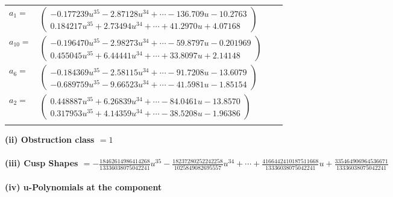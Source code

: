 \documentclass[1p]{elsarticle_modified}
\theoremstyle{definition}
\begin{document}
\begin{tabular}{m{7pt} m{180pt} m{7pt} m{180pt} }
\flushright $a_{1}=$&$\begin{pmatrix}-0.177239 u^{35}-2.87128 u^{34}+\cdots-136.709 u-10.2763\\0.184217 u^{35}+2.73494 u^{34}+\cdots+41.2970 u+4.07168\end{pmatrix}$ \\
\flushright $a_{10}=$&$\begin{pmatrix}-0.196470 u^{35}-2.98273 u^{34}+\cdots-59.8797 u-0.201969\\0.455045 u^{35}+6.44441 u^{34}+\cdots+33.8097 u+2.14148\end{pmatrix}$ \\
\flushright $a_{6}=$&$\begin{pmatrix}-0.184369 u^{35}-2.58115 u^{34}+\cdots-91.7208 u-13.6079\\-0.689759 u^{35}-9.66523 u^{34}+\cdots-41.5981 u-1.85154\end{pmatrix}$ \\
\flushright $a_{2}=$&$\begin{pmatrix}0.448887 u^{35}+6.26839 u^{34}+\cdots-84.0461 u-13.8570\\0.317953 u^{35}+4.14359 u^{34}+\cdots-38.5208 u-1.96386\end{pmatrix}$\\&\end{tabular}
\flushleft \textbf{(ii) Obstruction class $= 1$}\\~\\
\flushleft \textbf{(iii) Cusp Shapes $= -\frac{18462614986414268}{13336038075042241} u^{35}-\frac{18237280252242258}{1025849082695557} u^{34}+\cdots+\frac{4166442410187511668}{13336038075042241} u+\frac{335464906964536671}{13336038075042241}$}\\~\\
\newpage\renewcommand{\arraystretch}{1}
\flushleft \textbf{(iv) u-Polynomials at the component}\newline \\
\end{document}
